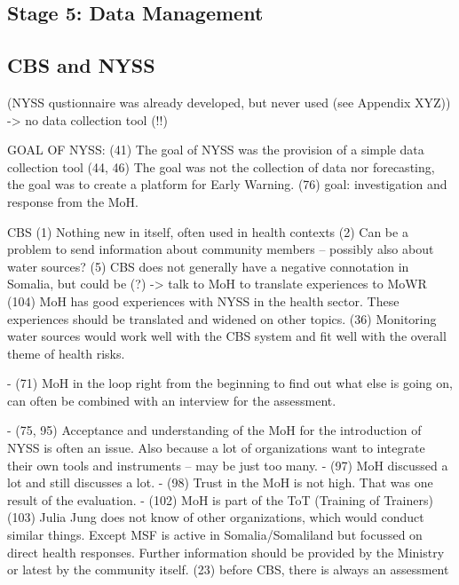 \subsection{Stage 5: Data Management}


\subsection{CBS and NYSS} (NYSS qustionnaire was already developed, but never used (see Appendix XYZ))
-> no data collection tool (!!) 















GOAL OF NYSS:
(41) The goal of NYSS was the provision of a simple data collection tool
(44, 46) The goal was not the collection of data nor forecasting, the goal was to create a platform for Early Warning.
(76) goal: investigation and response from the MoH.

CBS
(1) Nothing new in itself, often used in health contexts
(2) Can be a problem to send information about community members – possibly also about water sources? 
(5) CBS does not generally have a negative connotation in Somalia, but could be (?) -> talk to MoH to translate experiences to MoWR
(104) MoH has good experiences with NYSS in the health sector. These experiences should be translated and widened on other topics.
(36) Monitoring water sources would work well with the CBS system and fit well with the overall theme of health risks.


-	(71) MoH in the loop right from the beginning to find out what else is going on, can often be combined with an interview for the assessment.


-	(75, 95) Acceptance and understanding of the MoH for the introduction of NYSS is often an issue. Also because a lot of organizations want to integrate their own tools and instruments – may be just too many.
-	(97) MoH discussed a lot and still discusses a lot.
-	(98) Trust in the MoH is not high. That was one result of the evaluation.
-	(102) MoH is part of the ToT (Training of Trainers)
(103) Julia Jung does not know of other organizations, which would conduct similar things. Except MSF is active in Somalia/Somaliland but focussed on direct health responses. Further information should be provided by the Ministry or latest by the community itself.
(23) before CBS, there is always an assessment

